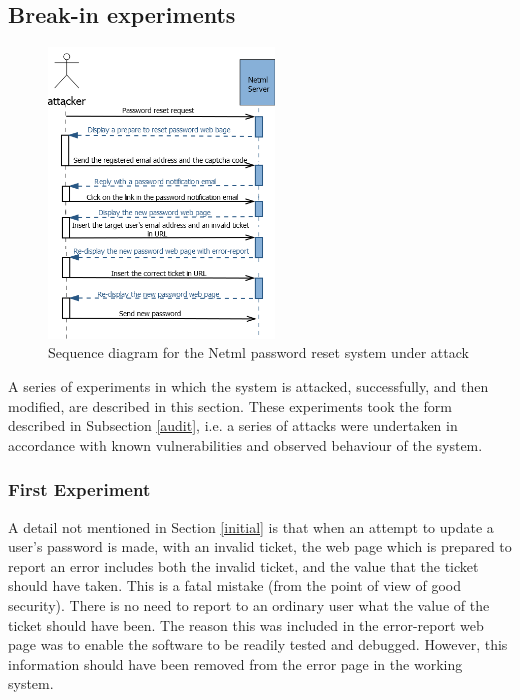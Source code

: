 \subsection{Break-in experiments}\label{brkexpts}
\begin{figure}
	\centering
		\includegraphics[width=6cm]{figures/attacker.png}
\caption{Sequence diagram for the Netml password reset  system under attack }
\label{seqdgnetmlattack}
\end{figure}
A series of experiments in which the system is attacked,
successfully, and then modified, are described in this section.
These experiments took the form described in Subsection \ref{audit},
i.e. a series of attacks were undertaken in accordance with known
vulnerabilities and observed behaviour of the system.

\subsubsection{First Experiment}
A detail not mentioned in Section \ref{initial} is that when an attempt
to update a user's password is made, with an invalid ticket, the web 
page which is prepared to report an error includes both the invalid
ticket, and the value that the ticket should have taken. This is a fatal
mistake (from the point of view of good security). There is no need
to report to an ordinary user what the value of the ticket should
have been. The reason this was included in the error-report web page
was to enable the software to be readily tested and debugged. However,
this information should have been removed from the error page
in the working system.

